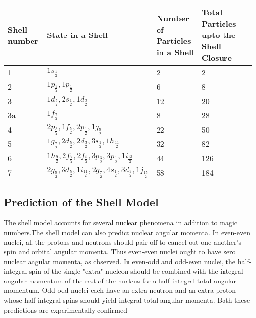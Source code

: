\begin{table}[H]
	\centering
	\renewcommand*{\arraystretch}{1.5}
	\begin{tabular}{|p{1.5cm}| p{5cm}|p{2cm}|p{2.5cm}|p{2.5cm}|}
		\hline	
		Shell number&State in a Shell&Number of Particles in a Shell&Total Particles upto the Shell Closure\\
		\hline
		1&$1 s_{\frac{1}{2}}$&2&2\\
		2&$1 p_{\frac{3}{2}}, 1 p_{\frac{1}{2}}$&6&8\\
		3&$1 d_{\frac{5}{2}}, 2 s_{\frac{1}{2}}, 1 d_{\frac{3}{2}}$&12&20\\
		3a&$1 f_{\frac{7}{2}}$&8&28\\
		4&$2 p_{\frac{3}{2}}, 1 f_{\frac{5}{2}}, 2 p_{\frac{1}{2}}, 1 g_{\frac{9}{2}}$&22&50\\
		5&$1 g_{\frac{7}{2}}, 2 d_{\frac{5}{2}}, 2 d_{\frac{3}{2}}, 3 s_{\frac{1}{2}}, 1 h_{\frac{11}{2}}$&32&82\\
		6&$1 h_{\frac{9}{2}}, 2 f_{\frac{7}{2}}, 2 f_{\frac{5}{2}}, 3 p_{\frac{3}{2}}, 3 p_{\frac{1}{2}}, 1 i_{\frac{13}{2}}$&44&126\\
		7&$2 g_{\frac{9}{2}}, 3 d_{\frac{5}{2}}, 1 i_{\frac{11}{2}}, 2 g_{\frac{7}{2}}, 4 s_{\frac{1}{2}}, 3 d_{\frac{3}{2}}, 1 j_{\frac{15}{2}}$&58&184\\
		\hline
	\end{tabular}
\end{table}
\subsection{Prediction of the Shell Model}
The shell model accounts for several nuclear phenomena in addition to magic numbers.The shell model can also predict nuclear angular momenta. In even-even nuclei, all the protons and neutrons should pair off to cancel out one another's spin and orbital angular momenta. Thus even-even nuclei ought to have zero nuclear angular momenta, as observed. In even-odd and odd-even nuclei, the half-integral spin of the single "extra" nucleon should be combined with the integral angular momentum of the rest of the nucleus for a half-integral total angular momentum. Odd-odd nuclei each have an extra neutron and an extra proton whose half-integral spins should yield integral total angular momenta. Both these predictions are experimentally confirmed.
